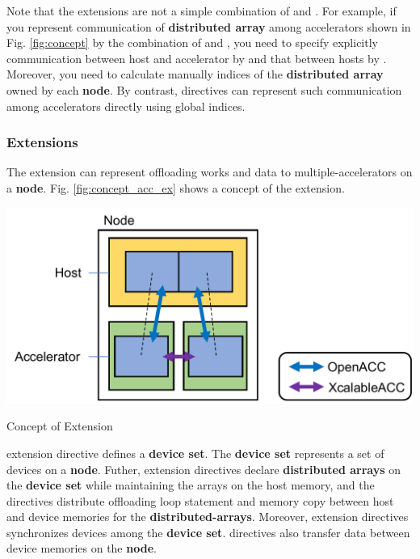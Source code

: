 Note that 
the {\XMP} extensions are not a simple combination of {\XMP} and {\OACC}.
For example, 
if you represent communication of {\bf distributed array} among accelerators shown in Fig. \ref{fig:concept} by the combination of {\XMP} and {\OACC},
you need to specify explicitly communication between host and accelerator by {\OACC} and that between hosts by {\XMP}.
Moreover,
you need to calculate manually indices of the {\bf distributed array} owned by each {\bf node}.
By contrast,
{\XACC} directives can represent such communication among accelerators directly using global indices.

\subsubsection{{\OACC} Extensions}
The {\OACC} extension can represent offloading works and data to multiple-accelerators on a {\bf node}.
Fig. \ref{fig:concept_acc_ex} shows a concept of the {\OACC} extension.

\begin{myfigure}
\includegraphics[width=\textwidth]{figs/concept_acc_ext.pdf}
  \caption{Concept of {\OACC} Extension}\label{fig:concept_acc_ex}
\end{myfigure}

{\OACC} extension directive defines a {\bf device set}.
The {\bf device set} represents a set of devices on a {\bf node}.
Futher, {\OACC} extension directives declare {\bf distributed arrays} on the {\bf device set} while maintaining the arrays on the host memory, and the directives distribute offloading loop statement and memory copy between host and device memories for the {\bf distributed-arrays}.
Moreover, {\OACC} extension directives synchronizes devices among the {\bf device set}.
{\XACC} directives also transfer data between device memories on the {\bf node}.

